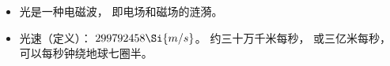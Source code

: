 
\begin{issues}
\issueDraft
\end{issues}

\begin{itemize}
\item 光是一种电磁波， 即电场和磁场的涟漪。
\item 光速（定义）： $299792458\Si{m/s}$。 约三十万千米每秒， 或三亿米每秒， 可以每秒钟绕地球七圈半。
\end{itemize}
